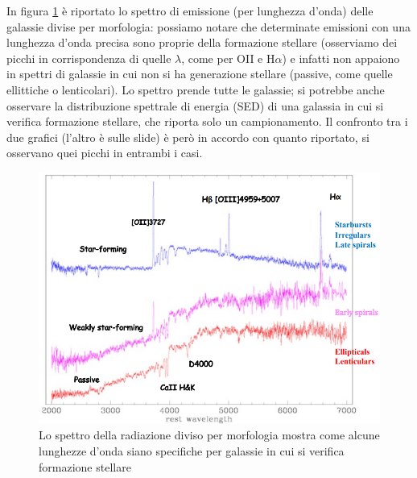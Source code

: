 In figura \ref{fig:spettro+galassie} è riportato lo spettro di emissione (per lunghezza d'onda) delle galassie divise per morfologia: possiamo notare che determinate emissioni con una lunghezza d'onda precisa sono proprie della formazione stellare (osserviamo dei picchi in corrispondenza di quelle $\lambda$, come per OII e H$\alpha$) e infatti non appaiono in spettri di galassie in cui non si ha generazione stellare (passive, come quelle ellittiche o lenticolari). Lo spettro prende tutte le galassie; si potrebbe anche osservare la distribuzione spettrale di energia (SED) di una galassia in cui si verifica formazione stellare, che riporta solo un campionamento. Il confronto tra i due grafici (l'altro è sulle slide) è però in accordo con quanto riportato, si osservano quei picchi in entrambi i casi.

\begin{figure}
    \centering
    \includegraphics[width = 0.5 \textwidth]{immagini/spettro-galassie.png}
    \caption{Lo spettro della radiazione diviso per morfologia mostra come alcune lunghezze d'onda siano specifiche per galassie in cui si verifica formazione stellare}
    \label{fig:spettro+galassie}
\end{figure}

